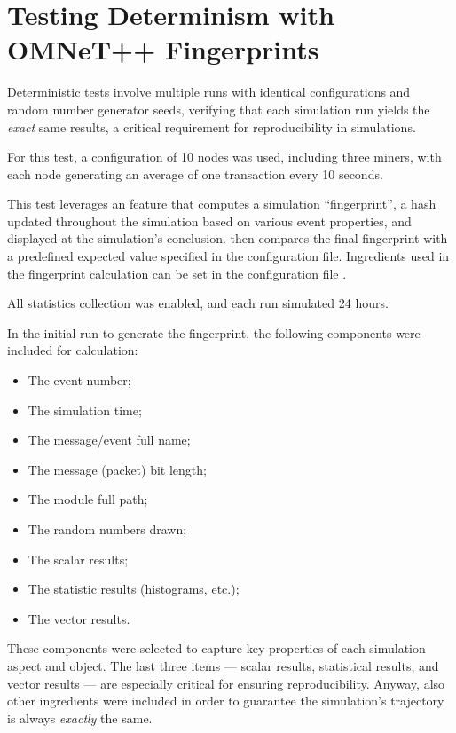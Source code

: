 \section{Testing Determinism with OMNeT++
Fingerprints}\label{sec:deterministic-tests}

Deterministic tests involve multiple runs with identical configurations and
random number generator seeds, verifying that each simulation run yields the
\textit{exact} same results, a critical requirement for reproducibility in
simulations.

For this test, a configuration of 10 nodes was used, including three miners,
with each node generating an average of one transaction every 10 seconds.

This test leverages an \omnetpp{} feature that computes a simulation
``fingerprint'', a hash updated throughout the simulation based on various
event properties, and displayed at the simulation's conclusion. \omnetpp{} then
compares the final fingerprint with a predefined expected value specified in
the configuration file. Ingredients used in the fingerprint calculation can be
set in the configuration file \cite[Section~15.4]{omnetpp-simulation-manual}.

All statistics collection was enabled, and each run simulated 24 hours.

In the initial run to generate the fingerprint, the following components were
included for calculation:
\begin{multicols}{2}
	\begin{itemize}
		\item The event number;
		\item The simulation time;
		\item The message/event full name;
		\item The message (packet) bit length;
		\item The module full path;
		\item The random numbers drawn;
		\item The scalar results;
		\item The statistic results (histograms, etc.);
		\item The vector results.
	\end{itemize}
\end{multicols}

These components were selected to capture key properties of each simulation
aspect and object. The last three items --- scalar results, statistical results,
and vector results --- are especially critical for ensuring reproducibility.
Anyway, also other ingredients were included in order to guarantee the
simulation's trajectory is always \textit{exactly} the same.

